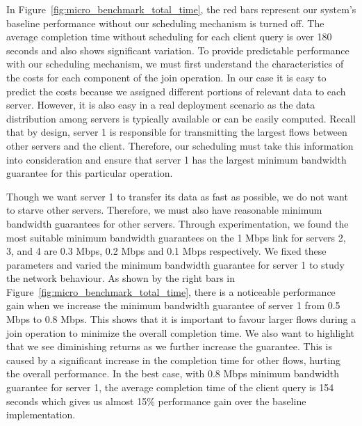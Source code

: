 \documentclass{sig-alternate-2013}
\begin{document}
In Figure~\ref{fig:micro_benchmark_total_time}, the red bars represent our system's baseline performance without our scheduling mechanism is turned off.
The average completion time without scheduling for each client query is over 180 seconds and also shows significant variation.
To provide predictable performance with our scheduling mechanism, we must first understand the characteristics of the costs for each component of the join operation.
In our case it is easy to predict the costs because we assigned different portions of relevant data to each server.
However, it is also easy in a real deployment scenario as the data distribution among servers is typically available or can be easily computed.
Recall that by design, server 1 is responsible for transmitting the largest flows between other servers and the client. 
Therefore, our scheduling must take this information into consideration and ensure that server 1 has the largest minimum bandwidth guarantee for this particular operation.

Though we want server 1 to transfer its data as fast as possible, we do not want to starve other servers.
Therefore, we must also have reasonable minimum bandwidth guarantees for other servers.
Through experimentation, we found the most suitable minimum bandwidth guarantees on the 1 Mbps link for servers 2, 3, and 4 are 0.3 Mbps, 0.2 Mbps and 0.1 Mbps respectively.
We fixed these parameters and varied the minimum bandwidth guarantee for server 1 to study the network behaviour.
As shown by the right bars in Figure~\ref{fig:micro_benchmark_total_time}, there is a noticeable performance gain when we increase the minimum bandwidth guarantee of server 1 from 0.5 Mbps to 0.8 Mbps.
This shows that it is important to favour larger flows during a join operation to minimize the overall completion time.
We also want to highlight that we see diminishing returns as we further increase the guarantee.
This is caused by a significant increase in the completion time for other flows, hurting the overall performance.
In the best case, with 0.8 Mbps minimum bandwidth guarantee for server 1, the average completion time of the client query is 154 seconds which gives us almost 15\% performance gain over the baseline implementation.
\end{document}

